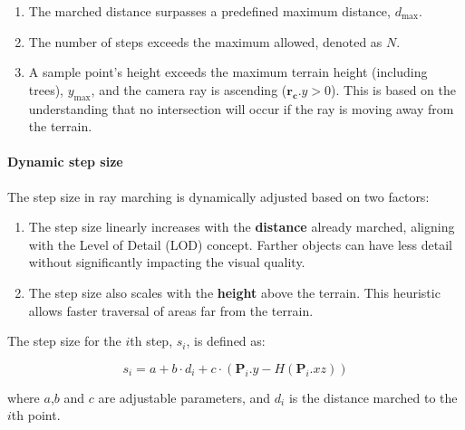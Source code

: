 \begin{enumerate}
    \item The marched distance surpasses a predefined maximum distance, $d_{\text{max}}$.
    \item The number of steps exceeds the maximum allowed, denoted as $N$.
    \item A sample point's height exceeds the maximum terrain height (including trees), $y_{\text{max}}$, and the camera ray is ascending ($\mathbf{r_c}.y > 0$). This is based on the understanding that no intersection will occur if the ray is moving away from the terrain.
\end{enumerate}

\paragraph{Dynamic step size}

The step size in ray marching is dynamically adjusted based on two factors:

\begin{enumerate}
    \item The step size linearly increases with the \textbf{distance} already marched, aligning with the Level of Detail (LOD) concept. Farther objects can have less detail without significantly impacting the visual quality. 

   
    \item The step size also scales with the \textbf{height} above the terrain. This heuristic allows faster traversal of areas far from the terrain. 

\end{enumerate}

The step size for the $i$th step, $s_i$, is defined as:

\begin{equation}
    s_{i} = a + b \cdot d_{i} + c \cdot (\mathbf{P}_i.y - H(\mathbf{P}_i.xz))
\label{terrain ray march}
\end{equation}

where $a$,$b$ and $c$ are adjustable parameters, and $d_i$ is the distance marched to the $i$th point.


